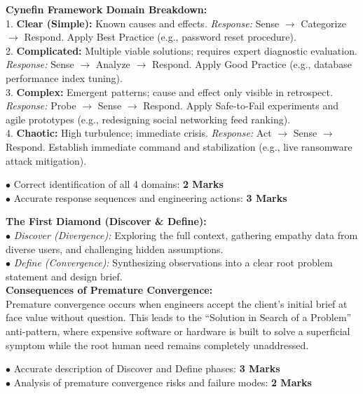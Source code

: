 \begin{solutionbox}
\textbf{Cynefin Framework Domain Breakdown:}\\
1. \textbf{Clear (Simple):} Known causes and effects. \textit{Response:} Sense $\to$ Categorize $\to$ Respond. Apply Best Practice (e.g., password reset procedure).\\
2. \textbf{Complicated:} Multiple viable solutions; requires expert diagnostic evaluation. \textit{Response:} Sense $\to$ Analyze $\to$ Respond. Apply Good Practice (e.g., database performance index tuning).\\
3. \textbf{Complex:} Emergent patterns; cause and effect only visible in retrospect. \textit{Response:} Probe $\to$ Sense $\to$ Respond. Apply Safe-to-Fail experiments and agile prototypes (e.g., redesigning social networking feed ranking).\\
4. \textbf{Chaotic:} High turbulence; immediate crisis. \textit{Response:} Act $\to$ Sense $\to$ Respond. Establish immediate command and stabilization (e.g., live ransomware attack mitigation).
\begin{markingrubric}
$\bullet$ Correct identification of all 4 domains: \textbf{2 Marks}\\
$\bullet$ Accurate response sequences and engineering actions: \textbf{3 Marks}
\end{markingrubric}
\end{solutionbox}

\begin{solutionbox}
\textbf{The First Diamond (Discover \& Define):}\\
$\bullet$ \textit{Discover (Divergence):} Exploring the full context, gathering empathy data from diverse users, and challenging hidden assumptions.\\
$\bullet$ \textit{Define (Convergence):} Synthesizing observations into a clear root problem statement and design brief.\\
\textbf{Consequences of Premature Convergence:}\\
Premature convergence occurs when engineers accept the client's initial brief at face value without question. This leads to the ``Solution in Search of a Problem'' anti-pattern, where expensive software or hardware is built to solve a superficial symptom while the root human need remains completely unaddressed.
\begin{markingrubric}
$\bullet$ Accurate description of Discover and Define phases: \textbf{3 Marks}\\
$\bullet$ Analysis of premature convergence risks and failure modes: \textbf{2 Marks}
\end{markingrubric}
\end{solutionbox}

